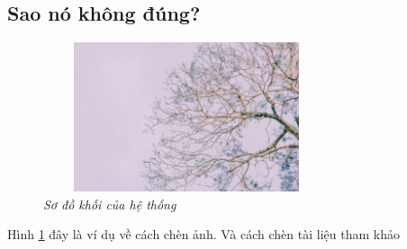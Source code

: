 \subsection{Sao nó không đúng?}
\lipsum
\begin{figure}[H]
    \centering
    \includegraphics[width=0.75\textwidth, height=4.39cm]{image/Tree.jpg}
    \caption[Sơ đồ khối của hệ thống]{\textit{\fontsize{12pt}{0}\selectfont Sơ đồ khối của hệ thống}}
    \label{hinh4.1}
\end{figure}
Hình \ref{hinh4.1} đây là ví dụ về cách chèn ảnh. Và cách chèn tài liệu tham khảo \cite{bracewell1989fourier}
\cleardoublepage